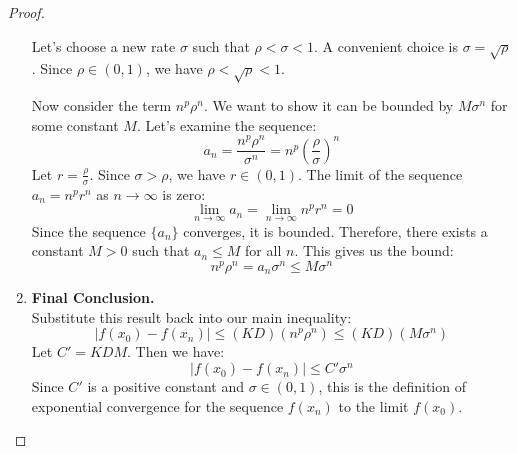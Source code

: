 \documentclass[../../main.tex]{subfiles}
\begin{document}
\begin{proof}
\begin{enumerate}
    Let's choose a new rate $\sigma$ such that $\rho < \sigma < 1$. A convenient choice is $\sigma = \sqrt{\rho}$. Since $\rho \in (0,1)$, we have $\rho < \sqrt{\rho} < 1$.

    Now consider the term $n^p \rho^n$. We want to show it can be bounded by $M \sigma^n$ for some constant $M$. Let's examine the sequence:
    \[
        a_n = \frac{n^p \rho^n}{\sigma^n} = n^p \left(\frac{\rho}{\sigma}\right)^n
    \]
    Let $r = \frac{\rho}{\sigma}$. Since $\sigma > \rho$, we have $r \in (0, 1)$. The limit of the sequence $a_n = n^p r^n$ as $n \to \infty$ is zero:
    \[
        \lim_{n \to \infty} a_n = \lim_{n \to \infty} n^p r^n = 0
    \]
    Since the sequence $\{a_n\}$ converges, it is bounded. Therefore, there exists a constant $M > 0$ such that $a_n \le M$ for all $n$. This gives us the bound:
    \[
        n^p \rho^n = a_n \sigma^n \le M \sigma^n
    \]

    \item \textbf{Final Conclusion.} \\
    Substitute this result back into our main inequality:
    \[
        |f(x_0) - f(x_n)| \le (KD) (n^p \rho^n) \le (KD)(M \sigma^n)
    \]
    Let $C' = KDM$. Then we have:
    \[
        |f(x_0) - f(x_n)| \le C' \sigma^n
    \]
    Since $C'$ is a positive constant and $\sigma \in (0, 1)$, this is the definition of exponential convergence for the sequence $f(x_n)$ to the limit $f(x_0)$.
\end{enumerate}
\end{proof}
\end{document}

